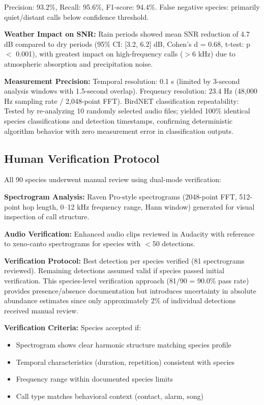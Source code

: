 \documentclass[twocolumn]{article}
\begin{document}
Precision: 93.2\%, Recall: 95.6\%, F1-score: 94.4\%. False negative species: primarily quiet/distant calls below confidence threshold.

\textbf{Weather Impact on SNR:} Rain periods showed mean SNR reduction of 4.7 dB compared to dry periods (95\% CI: [3.2, 6.2] dB, Cohen's d = 0.68, t-test: p $<$ 0.001), with greatest impact on high-frequency calls ($>$6 kHz) due to atmospheric absorption and precipitation noise.

\textbf{Measurement Precision:} Temporal resolution: 0.1 s (limited by 3-second analysis windows with 1.5-second overlap). Frequency resolution: 23.4 Hz (48,000 Hz sampling rate / 2,048-point FFT). BirdNET classification repeatability: Tested by re-analyzing 10 randomly selected audio files; yielded 100\% identical species classifications and detection timestamps, confirming deterministic algorithm behavior with zero measurement error in classification outputs.

\subsection{Human Verification Protocol}

All 90 species underwent manual review using dual-mode verification:

\textbf{Spectrogram Analysis:} Raven Pro-style spectrograms (2048-point FFT, 512-point hop length, 0--12 kHz frequency range, Hann window) generated for visual inspection of call structure.

\textbf{Audio Verification:} Enhanced audio clips reviewed in Audacity with reference to xeno-canto spectrograms for species with $<$50 detections.

\textbf{Verification Protocol:} Best detection per species verified (81 spectrograms reviewed). Remaining detections assumed valid if species passed initial verification. This species-level verification approach (81/90 = 90.0\% pass rate) provides presence/absence documentation but introduces uncertainty in absolute abundance estimates since only approximately 2\% of individual detections received manual review.

\textbf{Verification Criteria:} Species accepted if:
\begin{itemize}
\item Spectrogram shows clear harmonic structure matching species profile
\item Temporal characteristics (duration, repetition) consistent with species
\item Frequency range within documented species limits
\item Call type matches behavioral context (contact, alarm, song)
\end{itemize}
\end{document}
